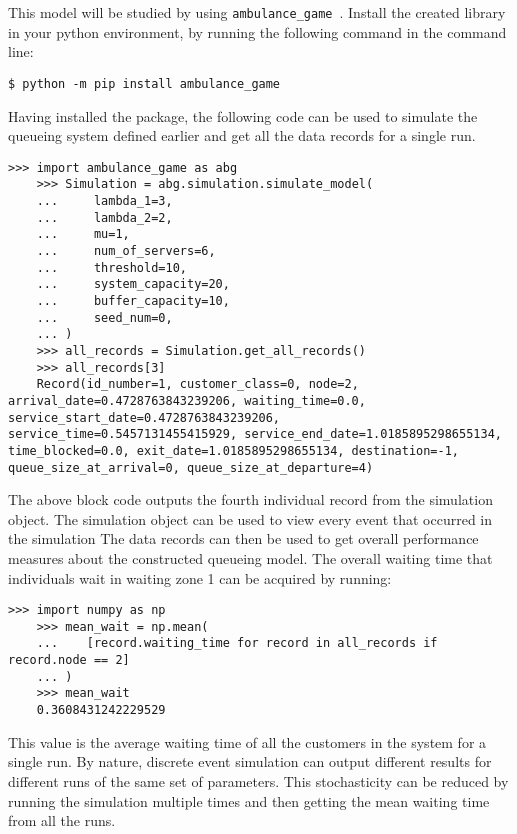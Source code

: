This model will be studied by using  
\lstinline[style=pystyle]{ambulance_game}~\cite{AmbulanceGame}.
Install the created library in your python environment, by running the 
following command in the command line:
\begin{lstlisting}[style=terminalstyle]
    $ python -m pip install ambulance_game
\end{lstlisting}

Having installed the package, the following code can be used to simulate the 
queueing system defined earlier and get all the data records for a single run.

\begin{lstlisting}[style=pystyle]
    >>> import ambulance_game as abg
    >>> Simulation = abg.simulation.simulate_model(
    ...     lambda_1=3,
    ...     lambda_2=2,
    ...     mu=1,
    ...     num_of_servers=6,
    ...     threshold=10,
    ...     system_capacity=20,
    ...     buffer_capacity=10,
    ...     seed_num=0,
    ... )
    >>> all_records = Simulation.get_all_records()
    >>> all_records[3]
    Record(id_number=1, customer_class=0, node=2, arrival_date=0.4728763843239206, waiting_time=0.0, service_start_date=0.4728763843239206, service_time=0.5457131455415929, service_end_date=1.0185895298655134, time_blocked=0.0, exit_date=1.0185895298655134, destination=-1, queue_size_at_arrival=0, queue_size_at_departure=4)

\end{lstlisting}

The above block code outputs the fourth individual record from the simulation
object.
The simulation object can be used to view every event that occurred in the 
simulation 
The data records can then be used to get overall performance measures about the
constructed queueing model.
The overall waiting time that individuals wait in waiting zone 1 can be acquired 
by running:


\begin{lstlisting}[style=pystyle]
    >>> import numpy as np
    >>> mean_wait = np.mean(
    ...    [record.waiting_time for record in all_records if record.node == 2]
    ... )
    >>> mean_wait
    0.3608431242229529

\end{lstlisting}

This value is the average waiting time of all the customers in the system for a
single run. 
By nature, discrete event simulation can output different results for different
runs of the same set of parameters.
This stochasticity can be reduced by running the simulation multiple times 
and then getting the mean waiting time from all the runs.

